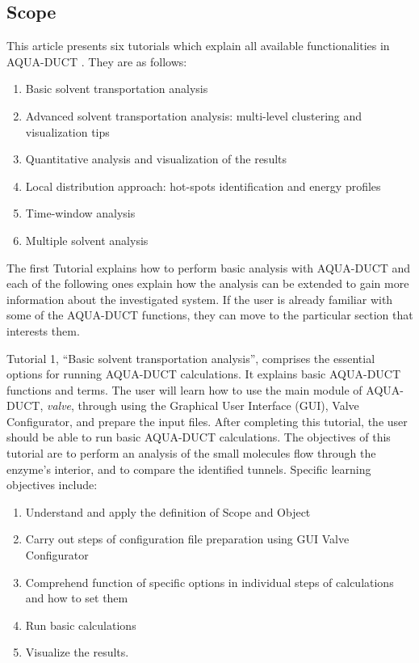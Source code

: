 \documentclass[9pt,tutorial, pubversion]{livecoms}
\begin{document}
\subsection{Scope}

This article presents six tutorials which explain all available functionalities in AQUA-DUCT \cite{Magdziarz2020}. They are as follows:
\begin{enumerate}
\item Basic solvent transportation analysis
\item Advanced solvent transportation analysis: multi-level clustering and visualization tips
\item Quantitative analysis and visualization of the results
\item Local distribution approach: hot-spots identification and energy profiles
\item Time-window analysis
\item Multiple solvent analysis
\end{enumerate}

The first Tutorial explains how to perform basic analysis with AQUA-DUCT and each of the following ones explain how the analysis can be extended to gain more information about the investigated system. If the user is already familiar with some of the AQUA-DUCT functions, they can move to the particular section that interests them. 

Tutorial 1, “Basic solvent transportation analysis”, comprises the essential options for running AQUA-DUCT calculations. It explains basic AQUA-DUCT functions and terms. The user will learn how to use the main module of AQUA-DUCT, \textit{valve}, through using the Graphical User Interface (GUI), Valve Configurator, and prepare the input files. After completing this tutorial, the user should be able to run basic AQUA-DUCT calculations. The objectives of this tutorial are to perform an analysis of the small molecules flow through the enzyme's interior, and to compare the identified tunnels. Specific learning objectives include:
\begin{enumerate}
  \item Understand and apply the definition of Scope and Object
  \item Carry out steps of configuration file preparation using GUI Valve Configurator
  \item Comprehend function of specific options in individual steps of calculations and how to set them
  \item Run basic calculations
  \item Visualize the results.
\end{enumerate}
\end{document}
